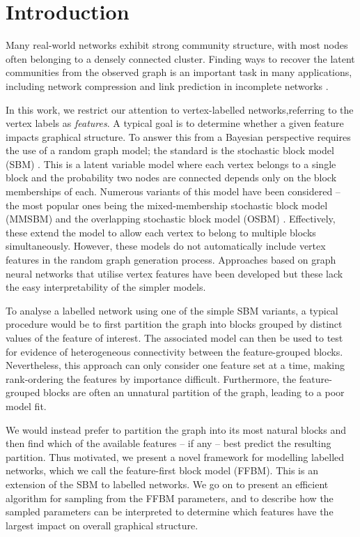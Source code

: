 \section{Introduction}

Many real-world networks exhibit strong community structure, with most nodes often belonging to a densely connected cluster. 
Finding ways to recover the latent communities from the observed graph is an important
task in many applications, including
network compression \cite{cluster-compression} and link prediction in 
incomplete networks \cite{link-prediction}.

In this work, we
restrict our attention to vertex-labelled networks,referring to the vertex labels as {\em features}. A typical goal is to determine whether a given feature impacts graphical structure. To answer this from a Bayesian perspective requires the use of a random graph model; the standard is the stochastic block model (SBM) \cite{vanilla-sbm}. This is a latent variable model where each vertex belongs to a single block and the probability two nodes are connected depends only on the block memberships of each. Numerous variants of this 
model have been considered -- the most popular ones being the mixed-membership stochastic block model (MMSBM) \cite{mixed-membership-sbm} and the overlapping stochastic block model (OSBM) \cite{overlapping-sbm}. Effectively, these extend the model to allow each vertex to belong to multiple blocks simultaneously. However, these models do not automatically include vertex features in the random graph generation process. Approaches based on graph neural networks \cite{sbm-gnn} that utilise vertex features have been developed but these lack the easy interpretability of the simpler models.

To analyse a labelled network using one of the simple SBM variants, a typical procedure would be to first partition the graph into blocks grouped by distinct values of the feature of interest. The associated model can then be used to test for evidence of heterogeneous connectivity between the feature-grouped blocks. Nevertheless, this approach can only consider one feature set at a time, making rank-ordering the features by importance difficult. Furthermore, the feature-grouped blocks are often an unnatural partition of the graph, leading to a poor model fit.

We would instead prefer to partition the graph into its most natural blocks and then find which of the available features -- if any -- best predict the resulting partition. Thus motivated, we present a novel framework for modelling labelled networks, which we call the feature-first block model (FFBM). This is an extension of the SBM to labelled networks. We go on to present an efficient algorithm for sampling from the FFBM parameters, and to describe how the sampled parameters can be interpreted to determine which features have the largest impact on overall graphical structure.
